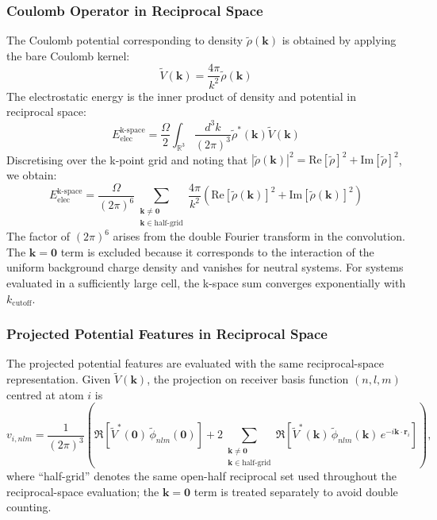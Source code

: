 \documentclass[aps,%
superscriptaddress,
 amsmath,amssymb,
floatfix,
twocolumn
]{revtex4-2}
\begin{document}
\subsubsection{Coulomb Operator in Reciprocal Space}

The Coulomb potential corresponding to density $\tilde{\rho}(\mathbf{k})$ is obtained by applying the bare Coulomb kernel:
\begin{equation}
\tilde{V}(\mathbf{k}) = \frac{4\pi}{k^2} \tilde{\rho}(\mathbf{k})
\end{equation}
The electrostatic energy is the inner product of density and potential in reciprocal space:
\begin{equation}
E_{\text{elec}}^{\text{k-space}} = \frac{\Omega}{2} \int_{\mathbb{R}^3} \frac{d^3k}{(2\pi)^3} \tilde{\rho}^*(\mathbf{k}) \tilde{V}(\mathbf{k})
\end{equation}
Discretising over the k-point grid and noting that $|\tilde{\rho}(\mathbf{k})|^2 = \text{Re}[\tilde{\rho}]^2 + \text{Im}[\tilde{\rho}]^2$, we obtain:
\begin{equation}
E_{\text{elec}}^{\text{k-space}} = \frac{\Omega}{(2\pi)^6} \sum_{\substack{\mathbf{k}\neq \mathbf{0}\\ \mathbf{k}\in \text{half-grid}}} \frac{4\pi}{k^2} \left( \text{Re}[\tilde{\rho}(\mathbf{k})]^2 + \text{Im}[\tilde{\rho}(\mathbf{k})]^2 \right)
\end{equation}
The factor of $(2\pi)^6$ arises from the double Fourier transform in the convolution. The $\mathbf{k}=\mathbf{0}$ term is excluded because it corresponds to the interaction of the uniform background charge density and vanishes for neutral systems. For systems evaluated in a sufficiently large cell, the k-space sum converges exponentially with $k_{\text{cutoff}}$.

\subsubsection{Projected Potential Features in Reciprocal Space}

The projected potential features are evaluated with the same reciprocal-space representation. Given $\tilde{V}(\mathbf{k})$, the projection on receiver basis function $(n,l,m)$ centred at atom $i$ is
\begin{equation}
v_{i,nlm}
=
\frac{1}{(2\pi)^3}\left(
\Re\!\left[\tilde{V}^*(\mathbf{0})\,\tilde{\phi}_{nlm}(\mathbf{0})\right]
+2\sum_{\substack{\mathbf{k}\neq \mathbf{0}\\ \mathbf{k}\in \text{half-grid}}}
\Re\!\left[
\tilde{V}^*(\mathbf{k})\,
\tilde{\phi}_{nlm}(\mathbf{k})\,
e^{-i\mathbf{k}\cdot\mathbf{r}_i}
\right]\right),
\label{eq:si_periodic_projected_potential}
\end{equation}
where ``half-grid'' denotes the same open-half reciprocal set used throughout the reciprocal-space evaluation; the $\mathbf{k}=\mathbf{0}$ term is treated separately to avoid double counting.
\end{document}
